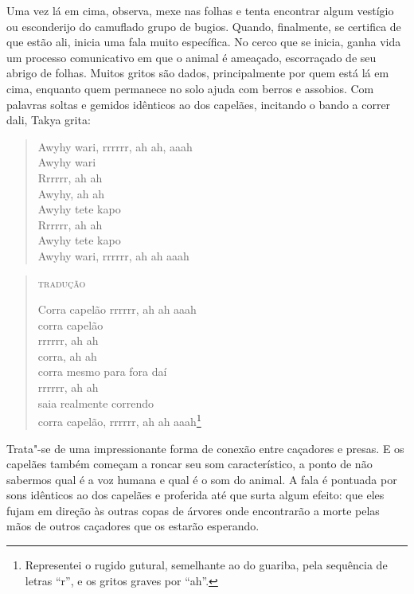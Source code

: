 Uma vez lá em cima, observa, mexe nas folhas e tenta encontrar algum
vestígio ou esconderijo do camuflado grupo de bugios. Quando,
finalmente, se certifica de que estão ali, inicia uma fala muito
específica. No cerco que se inicia, ganha vida um processo comunicativo
em que o animal é ameaçado, escorraçado de seu abrigo de folhas. Muitos
gritos são dados, principalmente por quem está lá em cima, enquanto quem
permanece no solo ajuda com berros e assobios. Com palavras soltas e
gemidos idênticos ao dos capelães, incitando o bando a correr dali,
Takya grita:

\begin{verse}
Awyhy wari, rrrrrr, ah ah, aaah\\
Awyhy wari\\
Rrrrrr, ah ah\\
Awyhy, ah ah\\
Awyhy tete kapo\\
Rrrrrr, ah ah\\
Awyhy tete kapo\\
Awyhy wari, rrrrrr, ah ah aaah
\end{verse}

\begin{verse}
\textsc{tradução}

Corra capelão rrrrrr, ah ah aaah\\
corra capelão\\
rrrrrr, ah ah\\
corra, ah ah\\
corra mesmo para fora daí\\
rrrrrr, ah ah\\
saia realmente correndo\\
corra capelão, rrrrrr, ah ah aaah\footnote{Representei o rugido gutural,
  semelhante ao do guariba, pela sequência de letras ``r'', e os gritos
  graves por ``ah''.}
\end{verse}

Trata"-se de uma impressionante forma de conexão entre caçadores e
presas. E os capelães também começam a roncar seu som característico, a
ponto de não sabermos qual é a voz humana e qual é o som do animal. A
fala é pontuada por sons idênticos ao dos capelães e proferida até que
surta algum efeito: que eles fujam em direção às outras copas de árvores
onde encontrarão a morte pelas mãos de outros caçadores que os estarão
esperando.



